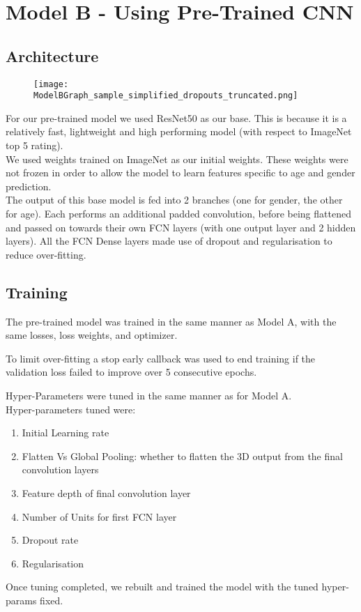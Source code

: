 \section{Model B - Using Pre-Trained CNN}
\subsection{Architecture}
\begin{figure}[h]
    \centering
    \texttt{[image: ModelBGraph\_sample\_simplified\_dropouts\_truncated.png]}
\end{figure}
For our pre-trained model we used ResNet50 as our base. This is because it is a relatively fast, lightweight and high performing model (with respect to ImageNet top 5 rating).\\
We used weights trained on ImageNet as our initial weights.
These weights were not frozen in order to allow the model to learn features specific to age and gender prediction.\\
The output of this base model is fed into 2 branches (one for gender, the other for age).
Each performs an additional padded convolution, before being flattened and passed on towards their own FCN layers (with one output layer and 2 hidden layers).
All the FCN Dense layers made use of dropout and regularisation to reduce over-fitting.

\subsection{Training}
The pre-trained model was trained in the same manner as Model A, with the same losses, loss weights, and optimizer. 

To limit over-fitting a stop early callback was used to end training if the validation loss failed to improve over 5 consecutive epochs.

Hyper-Parameters were tuned in the same manner as for Model A.\\
Hyper-parameters tuned were:
\begin{enumerate}
    \item Initial Learning rate
    \item Flatten Vs Global Pooling: whether to flatten the 3D output from the final convolution layers
    \item Feature depth of final convolution layer 
    \item Number of Units for first FCN layer 
    \item Dropout rate
    \item Regularisation 
\end{enumerate}
Once tuning completed, we rebuilt and trained the model with the tuned hyper-params fixed.

